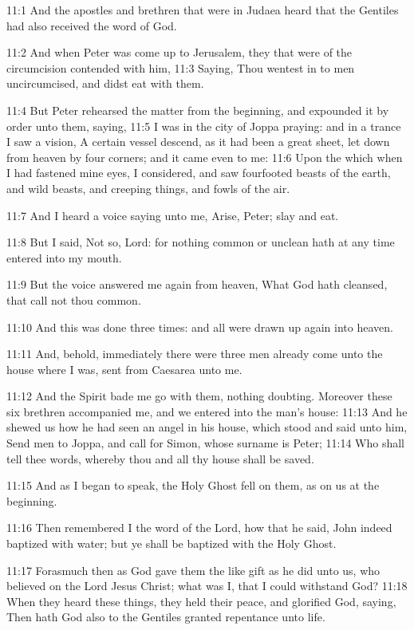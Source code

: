 11:1 And the apostles and brethren that were in Judaea heard that the
Gentiles had also received the word of God.

11:2 And when Peter was come up to Jerusalem, they that were of the
circumcision contended with him, 11:3 Saying, Thou wentest in to men
uncircumcised, and didst eat with them.

11:4 But Peter rehearsed the matter from the beginning, and expounded
it by order unto them, saying, 11:5 I was in the city of Joppa
praying: and in a trance I saw a vision, A certain vessel descend, as
it had been a great sheet, let down from heaven by four corners; and
it came even to me: 11:6 Upon the which when I had fastened mine eyes,
I considered, and saw fourfooted beasts of the earth, and wild beasts,
and creeping things, and fowls of the air.

11:7 And I heard a voice saying unto me, Arise, Peter; slay and eat.

11:8 But I said, Not so, Lord: for nothing common or unclean hath at
any time entered into my mouth.

11:9 But the voice answered me again from heaven, What God hath
cleansed, that call not thou common.

11:10 And this was done three times: and all were drawn up again into
heaven.

11:11 And, behold, immediately there were three men already come unto
the house where I was, sent from Caesarea unto me.

11:12 And the Spirit bade me go with them, nothing doubting. Moreover
these six brethren accompanied me, and we entered into the man's
house: 11:13 And he shewed us how he had seen an angel in his house,
which stood and said unto him, Send men to Joppa, and call for Simon,
whose surname is Peter; 11:14 Who shall tell thee words, whereby thou
and all thy house shall be saved.

11:15 And as I began to speak, the Holy Ghost fell on them, as on us
at the beginning.

11:16 Then remembered I the word of the Lord, how that he said, John
indeed baptized with water; but ye shall be baptized with the Holy
Ghost.

11:17 Forasmuch then as God gave them the like gift as he did unto us,
who believed on the Lord Jesus Christ; what was I, that I could
withstand God?  11:18 When they heard these things, they held their
peace, and glorified God, saying, Then hath God also to the Gentiles
granted repentance unto life.

